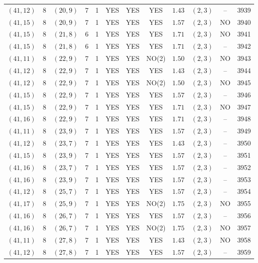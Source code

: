 \begin{longtable}{|c|c|c|c|c|c|c|c|c|c|c|c|}
$(41,12)$ & 8 & $(20,9)$ & 7 & 1 & YES & YES & YES & $1.43$ & $(2,3)$ & -- & 3939\\
$(41,15)$ & 8 & $(20,9)$ & 7 & 1 & YES & YES & YES & $1.57$ & $(2,3)$ & NO & 3940\\
$(41,15)$ & 8 & $(21,8)$ & 6 & 1 & YES & YES & YES & $1.71$ & $(2,3)$ & NO & 3941\\
$(41,15)$ & 8 & $(21,8)$ & 6 & 1 & YES & YES & YES & $1.71$ & $(2,3)$ & -- & 3942\\
$(41,11)$ & 8 & $(22,9)$ & 7 & 1 & YES & YES & NO(2) & $1.50$ & $(2,3)$ & NO & 3943\\
$(41,12)$ & 8 & $(22,9)$ & 7 & 1 & YES & YES & YES & $1.43$ & $(2,3)$ & -- & 3944\\
$(41,12)$ & 8 & $(22,9)$ & 7 & 1 & YES & YES & NO(2) & $1.50$ & $(2,3)$ & NO & 3945\\
$(41,15)$ & 8 & $(22,9)$ & 7 & 1 & YES & YES & YES & $1.57$ & $(2,3)$ & -- & 3946\\
$(41,15)$ & 8 & $(22,9)$ & 7 & 1 & YES & YES & YES & $1.71$ & $(2,3)$ & NO & 3947\\
$(41,16)$ & 8 & $(22,9)$ & 7 & 1 & YES & YES & YES & $1.71$ & $(2,3)$ & -- & 3948\\
$(41,11)$ & 8 & $(23,9)$ & 7 & 1 & YES & YES & YES & $1.57$ & $(2,3)$ & -- & 3949\\
$(41,12)$ & 8 & $(23,7)$ & 7 & 1 & YES & YES & YES & $1.43$ & $(2,3)$ & -- & 3950\\
$(41,15)$ & 8 & $(23,9)$ & 7 & 1 & YES & YES & YES & $1.57$ & $(2,3)$ & -- & 3951\\
$(41,16)$ & 8 & $(23,7)$ & 7 & 1 & YES & YES & YES & $1.57$ & $(2,3)$ & -- & 3952\\
$(41,16)$ & 8 & $(23,9)$ & 7 & 1 & YES & YES & YES & $1.57$ & $(2,3)$ & -- & 3953\\
$(41,12)$ & 8 & $(25,7)$ & 7 & 1 & YES & YES & YES & $1.57$ & $(2,3)$ & -- & 3954\\
$(41,17)$ & 8 & $(25,9)$ & 7 & 1 & YES & YES & NO(2) & $1.75$ & $(2,3)$ & NO & 3955\\
$(41,16)$ & 8 & $(26,7)$ & 7 & 1 & YES & YES & YES & $1.57$ & $(2,3)$ & -- & 3956\\
$(41,16)$ & 8 & $(26,7)$ & 7 & 1 & YES & YES & NO(2) & $1.75$ & $(2,3)$ & NO & 3957\\
$(41,11)$ & 8 & $(27,8)$ & 7 & 1 & YES & YES & YES & $1.43$ & $(2,3)$ & NO & 3958\\
$(41,12)$ & 8 & $(27,8)$ & 7 & 1 & YES & YES & YES & $1.57$ & $(2,3)$ & -- & 3959\\

\end{longtable}
